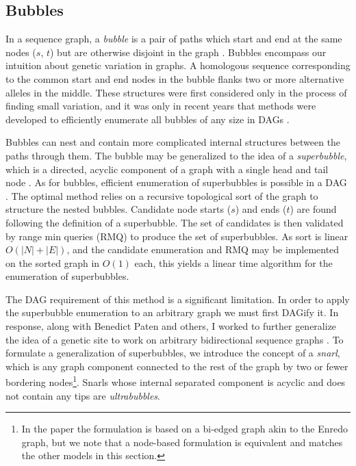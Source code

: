 \subsection{Bubbles}

In a sequence graph, a \emph{bubble} is a pair of paths which start and end at the same nodes ($s$, $t$) but are otherwise disjoint in the graph \cite{zerbino2008velvet}.
Bubbles encompass our intuition about genetic variation in graphs.
A homologous sequence corresponding to the common start and end nodes in the bubble flanks two or more alternative alleles in the middle.
These structures were first considered only in the process of finding small variation, and it was only in recent years that methods were developed to efficiently enumerate all bubbles of any size in DAGs \cite{birmele2012efficient}.

Bubbles can nest and contain more complicated internal structures between the paths through them.
The bubble may be generalized to the idea of a \emph{superbubble}, which is a directed, acyclic component of a graph with a single head and tail node \cite{onodera2013detecting}.
As for bubbles, efficient enumeration of superbubbles is possible in a DAG \cite{brankovic2016linear}.
The optimal method relies on a recursive topological sort of the graph to structure the nested bubbles.
Candidate node starts ($s$) and ends ($t$) are found following the definition of a superbubble.
The set of candidates is then validated by range min queries (RMQ) to produce the set of superbubbles.
As sort is linear $O(|N| + |E|)$, and the candidate enumeration and RMQ may be implemented on the sorted graph in $O(1)$ each, this yields a linear time algorithm for the enumeration of superbubbles.

The DAG requirement of this method is a significant limitation.
In order to apply the superbubble enumeration to an arbitrary graph we must first DAGify it.
In response, along with Benedict Paten and others, I worked to further generalize the idea of a genetic site to work on arbitrary bidirectional sequence graphs \cite{paten2018superbubbles}.
To formulate a generalization of superbubbles, we introduce the concept of a \emph{snarl}, which is any graph component connected to the rest of the graph by two or fewer bordering nodes\footnote{In the paper the formulation is based on a bi-edged graph akin to the Enredo graph, but we note that a node-based formulation is equivalent and matches the other models in this section.}.
Snarls whose internal separated component is acyclic and does not contain any tips are \emph{ultrabubbles}.

